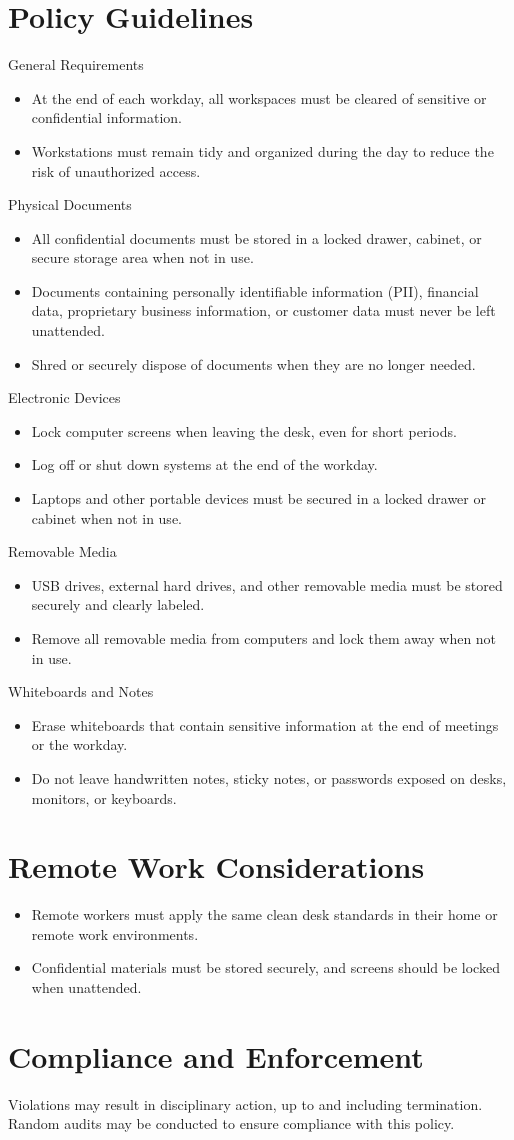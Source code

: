 \section{Policy Guidelines}
General Requirements
\begin{itemize}
    \item At the end of each workday, all workspaces must be cleared of sensitive or confidential information.
    \item Workstations must remain tidy and organized during the day to reduce the risk of unauthorized access.
\end{itemize}
Physical Documents
\begin{itemize}
    \item All confidential documents must be stored in a locked drawer, cabinet, or secure storage area when not in use.
    \item Documents containing personally identifiable information (PII), financial data, proprietary business information, or customer data must never be left unattended.
    \item Shred or securely dispose of documents when they are no longer needed.
\end{itemize}
Electronic Devices
\begin{itemize}
    \item Lock computer screens when leaving the desk, even for short periods.
    \item Log off or shut down systems at the end of the workday.
    \item Laptops and other portable devices must be secured in a locked drawer or cabinet when not in use.
\end{itemize}
Removable Media
\begin{itemize}
    \item USB drives, external hard drives, and other removable media must be stored securely and clearly labeled.
    \item Remove all removable media from computers and lock them away when not in use.
\end{itemize}
Whiteboards and Notes
\begin{itemize}
    \item Erase whiteboards that contain sensitive information at the end of meetings or the workday.
    \item Do not leave handwritten notes, sticky notes, or passwords exposed on desks, monitors, or keyboards.
\end{itemize}
\section{Remote Work Considerations}
\begin{itemize}
    \item Remote workers must apply the same clean desk standards in their home or remote work environments.
    \item Confidential materials must be stored securely, and screens should be locked when unattended.
\end{itemize}
\section{Compliance and Enforcement}
Violations may result in disciplinary action, up to and including termination. Random audits may be conducted to ensure compliance with this policy.
    
    

